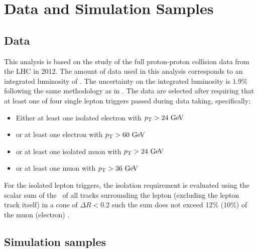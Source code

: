 \section{Data and Simulation Samples}
\subsection{Data}
\label{sec:subsection_data}


This analysis is based on the study of the full proton-proton collision
data from the LHC in 2012. The amount 
of data used in this analysis corresponds to 
an integrated luminosity of \lumi.
The uncertainty on the integrated luminosity is $1.9\%$ 
following the same methodology as in \cite{Aad:2013ucp}.
The data are selected after requiring that at least one
of four single lepton triggers passed during data taking, 
specifically:
\begin{itemize}
\item[] Either at least one isolated electron with $\pt > 24 \GeV$
\item[] or at least one electron with $\pt > 60 \GeV$
\item[] or at least one isolated muon with $\pt > 24 \GeV$
\item[] or at least one muon with $\pt > 36 \GeV$
\end{itemize}
For the isolated lepton triggers, the isolation requirement is evaluated 
using the scalar sum of the \pt~of all tracks surrounding the lepton 
(excluding the lepton track itself) in a cone of $\Delta R < 0.2$
such the sum does not exceed 12\% (10\%) of the muon (electron)  \pt.


\subsection{Simulation samples}

